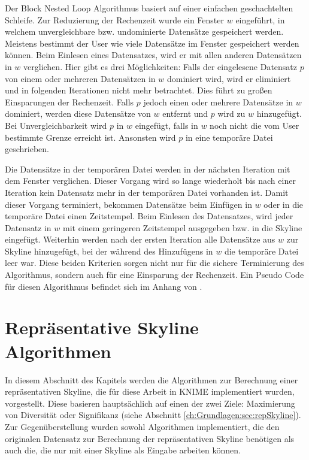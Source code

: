 Der Block Nested Loop Algorithmus basiert auf einer einfachen geschachtelten Schleife. Zur Reduzierung der Rechenzeit wurde ein Fenster $w$ eingeführt, in welchem unvergleichbare bzw. undominierte Datensätze gespeichert werden. Meistens bestimmt der User wie viele Datensätze im Fenster gespeichert werden können.
Beim Einlesen eines Datensatzes, wird er mit allen anderen Datensätzen in $w$ verglichen. Hier gibt es drei Möglichkeiten:
Falls der eingelesene Datensatz $p$ von einem oder mehreren Datensätzen in $w$ dominiert wird, wird er eliminiert und in folgenden Iterationen nicht mehr betrachtet. Dies führt zu großen Einsparungen der Rechenzeit. 
Falls $p$ jedoch einen oder mehrere Datensätze in $w$ dominiert, werden diese Datensätze von $w$ entfernt und $p$ wird zu $w$ hinzugefügt.
Bei Unvergleichbarkeit wird $p$ in $w$ eingefügt, falls in $w$ noch nicht die vom User bestimmte Grenze erreicht ist. Ansonsten wird $p$ in eine temporäre Datei geschrieben.

Die Datensätze in der temporären Datei werden in der nächsten Iteration mit dem Fenster verglichen. Dieser Vorgang wird so lange wiederholt bis nach einer Iteration kein Datensatz mehr in der temporären Datei vorhanden ist.
Damit dieser Vorgang terminiert, bekommen Datensätze beim Einfügen in $w$ oder in die temporäre Datei einen Zeitstempel. Beim Einlesen des Datensatzes, wird jeder Datensatz in $w$ mit einem geringeren Zeitstempel ausgegeben  bzw. in die Skyline eingefügt.
Weiterhin werden nach der ersten Iteration alle Datensätze aus $w$ zur Skyline hinzugefügt, bei der während des Hinzufügens in $w$ die temporäre Datei leer war.
Diese beiden Kriterien sorgen nicht nur für die sichere Terminierung des Algorithmus, sondern auch für eine Einsparung der Rechenzeit.
Ein Pseudo Code für diesen Algorithmus befindet sich im Anhang von \cite{borzsony2001skyline}.
\section{Repräsentative Skyline Algorithmen}
\label{ch:Analyse:sec:repSkyAlgos}
In diesem Abschnitt des Kapitels werden die Algorithmen zur Berechnung einer repräsentativen Skyline, die für diese Arbeit in KNIME implementiert wurden, vorgestellt. 
Diese basieren hauptsächlich auf einen der zwei Ziele: Maximierung von Diversität oder Signifikanz (siehe Abschnitt \ref{ch:Grundlagen:sec:repSkyline}).
Zur Gegenüberstellung wurden sowohl Algorithmen implementiert, die den originalen Datensatz zur Berechnung der repräsentativen Skyline benötigen als auch die, die nur mit einer Skyline als Eingabe arbeiten können.
